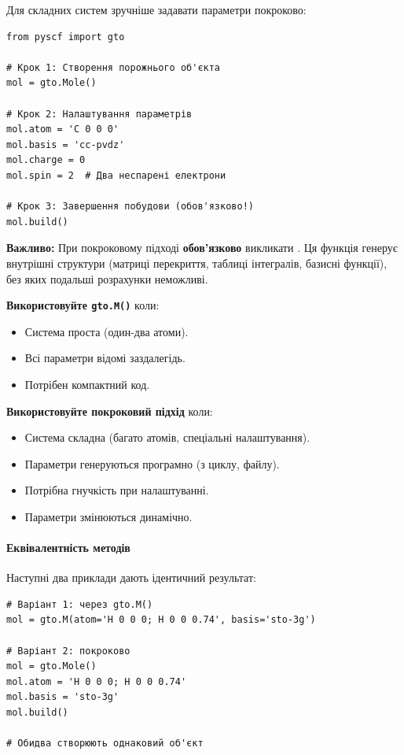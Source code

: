 Для складних систем зручніше задавати параметри покроково:

\begin{verbatim}
from pyscf import gto

# Крок 1: Створення порожнього об'єкта
mol = gto.Mole()

# Крок 2: Налаштування параметрів
mol.atom = 'C 0 0 0'
mol.basis = 'cc-pvdz'
mol.charge = 0
mol.spin = 2  # Два неспарені електрони

# Крок 3: Завершення побудови (обов'язково!)
mol.build()
\end{verbatim}

\textbf{Важливо:} При покроковому підході \textbf{обов'язково} викликати .
Ця функція генерує внутрішні структури (матриці перекриття, таблиці інтегралів, базисні функції),
без яких подальші розрахунки неможливі.

\begin{commentbox}
	\textbf{Використовуйте \texttt{gto.M()}} коли:
	\begin{itemize}
		\item Система проста (один-два атоми).
		\item Всі параметри відомі заздалегідь.
		\item Потрібен компактний код.
	\end{itemize}

	\textbf{Використовуйте покроковий підхід} коли:
	\begin{itemize}
		\item Система складна (багато атомів, спеціальні налаштування).
		\item Параметри генеруються програмно (з циклу, файлу).
		\item Потрібна гнучкість при налаштуванні.
		\item Параметри змінюються динамічно.
	\end{itemize}
\end{commentbox}

\paragraph{Еквівалентність методів}

Наступні два приклади дають ідентичний результат:

\begin{verbatim}
# Варіант 1: через gto.M()
mol = gto.M(atom='H 0 0 0; H 0 0 0.74', basis='sto-3g')

# Варіант 2: покроково
mol = gto.Mole()
mol.atom = 'H 0 0 0; H 0 0 0.74'
mol.basis = 'sto-3g'
mol.build()

# Обидва створюють однаковий об'єкт
\end{verbatim}

